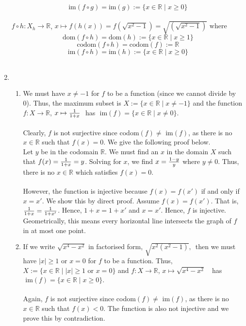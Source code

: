 \documentclass[12pt]{amsart}
\begin{document}
\begin{enumerate}
		$$\text{im}(f \circ g) = \text{im}(g) := \{x \in \mathbb{R}  \mid x \ge 0\}$$
		\\
		$f\circ h : X_h \rightarrow  \mathbb{R}$, \text{ } $x \mapsto f(h(x))= f(\sqrt{x^2-1})=
		\sqrt{\left(\sqrt{x^2-1}\right)} \text{ where }$\\
		$$\text{dom}(f \circ h) = \text{dom}(h) := \{x \in \mathbb{R} \mid x \ge 1\}$$
		$$\text{codom}(f \circ h) = \text{codom}(f) := \mathbb{R}$$
		$$\text{im}(f \circ h) = \text{im}(h) := \{x \in \mathbb{R}  \mid x \ge 0\}$$
		\\
	\item 
		\begin{enumerate}
		
			\item 
				We must have $x \ne -1$ for $f$ to be a function (since we cannot divide by 0). Thus, the 				maximum subset is $X := \{x \in \mathbb{R} \mid x \ne -1\}$ and the function
				$f : X \rightarrow \mathbb{R}$, \text{  } $x \mapsto {1 \over 1+x} \text { }$ has 
				$\text{ im}(f) = \{x \in \mathbb{R}  \mid x \ne 0\}$.\\
				\\
				Clearly, $f$ is not surjective since codom$(f) \ne$ im$(f)$, as there is no 
				$x \in \mathbb{R}$ such that $f(x) = 0$.  We give the following proof below.\\
				
				Let $y$ be in the codomain $ \mathbb{R}$.  We must find an $x$ in the domain $X$ 					such that $f(x) =  {1 \over 1+x} = y$.  Solving for $x$, we find 
				$x = {1-y \over y}$ where $y \ne 0$.  Thus, there is no $x \in \mathbb{R}$ which satisfies 
				$f(x)=0$.\\ 
				\\
				However, the function is injective because $f(x) = f(x')$ if and only if $x=x'$. We show this
				by direct proof.  Assume $f(x)=f(x')$.  That is, ${1 \over 1+x} = {1 \over 1+x'}$.  Hence, 
				$1+x=1+x'$ and $x=x'$. Hence, $f$ is injective.\\
				
				Geometrically, this means every horizontal line intersects the graph of $f$ in at most one 
				point.\\
			
			\item
				If we write $\sqrt{x^4-x^2}$ in factorised form, $\sqrt{x^2(x^2-1)} \text{, }$ then we 						must have $|x| \ge 1$ or $x=0$ for $f$ to be a function.  Thus,
				$X := \{x \in \mathbb{R} \mid |x| \ge 1 \text{ or } x=0\}$ and $f: X \rightarrow \mathbb{R}$,
				\text{ } $x \mapsto \sqrt{x^4-x^2} \text { }$ has $\text{ im}(f) = \{x \in \mathbb{R}  
				\mid x \ge 0\}$.\\
				\\
				Again, $f$ is not surjective since codom$(f) \ne$ im$(f)$, as there is no
				$x \in \mathbb{R}$ such that $f(x) < 0$. The function is also not injective and we prove 					this by contradiction.\\  
				

\end{enumerate}
\end{enumerate}
\end{document}
